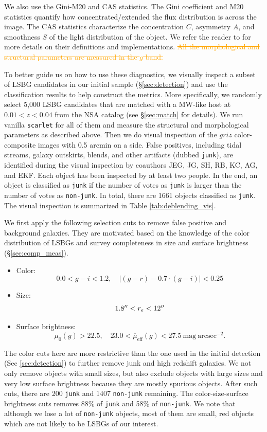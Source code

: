 \documentclass[twocolumn,astrosymb,twocolappendix,linenumbers]{aastex631}
\newcommand{\sbunit}{\mathrm{mag\ arcsec}^{-2}}
\newcommand{\sbeff}{\overline{\mu}_{\mathrm{eff}}(g)}
\newcommand{\emphasize}{\textcolor{orange}}
\newcommand{\code}[1]{\texttt{#1}}
\begin{document}
\begin{CJK*}{UTF8}{gbsn}
We also use the Gini-M20 and CAS statistics. The Gini coefficient and M20 statistics \citep{Abraham2003,Lotz2004} quantify how concentrated/extended the flux distribution is across the image. The CAS statistics characterize the concentration $C$, asymmetry $A$, and smoothness $S$ of the light distribution of the object. We refer the reader to \citet{statmorph} for more details on their definitions and implementations. \emphasize{\st{All the morphological and structural parameters are measured in the $g$ band.}}


To better guide us on how to use these diagnostics, we visually inspect a subset of LSBG candidates in our initial sample (\S \ref{sec:detection}) and use the classification results to help construct the metrics. More specifically, we randomly select 5,000 LSBG candidates that are matched with a MW-like host at $0.01 < z < 0.04$ from the NSA catalog (see \S\ref{sec:match} for details). We run vanilla \code{scarlet} for all of them and measure the structural and morphological parameters as described above. Then we do visual inspection of the $griz$ color-composite images with 0.5 arcmin on a side. False positives, including tidal streams, galaxy outskirts, blends, and other artifacts (dubbed \code{junk}), are identified during the visual inspection by coauthors JEG, JG, SH, RB, KC, AG, and EKF. Each object has been inspected by at least two people. In the end, an object is classified as \code{junk} if the number of votes as \code{junk} is larger than the number of votes as \code{non-junk}. In total, there are 1661 objects classified as \code{junk}. The visual inspection is summarized in Table \ref{tab:deblending_vis}.


We first apply the following selection cuts to remove false positive and background galaxies. They are motivated based on the knowledge of the color distribution of LSBGs \citep[e.g.,][]{SAGA-I,Greco2018,Zaritsky2019,Tanoglidis2021} and survey completeness in size and surface brightness (\S\ref{sec:comp_meas}). 
\begin{itemize}
    \item Color:
    \[0.0 < g-i < 1.2,\quad |(g-r) - 0.7\cdot (g-i)| < 0.25\]
    \item Size: \[1.8 \mbox{$^{\prime\prime}$} < r_e < 12 \mbox{$^{\prime\prime}$}\]
    \item Surface brightness: \[\mu_0(g) > 22.5,\quad 23.0 < \sbeff < 27.5\ \sbunit.\]
\end{itemize}
The color cuts here are more restrictive than the one used in the initial detection (Sec \ref{sec:detection}) to further remove junk and high redshift galaxies. We not only remove objects with small sizes, but also exclude objects with large sizes and very low surface brightness because they are mostly spurious objects.
After such cuts, there are 200 \code{junk} and 1407 \code{non-junk} remaining. The color-size-surface brightness cuts removes 88\% of \code{junk} and 58\% of \code{non-junk}. We note that although we lose a lot of \code{non-junk} objects, most of them are small, red  objects which are not likely to be LSBGs of our interest. 



\end{CJK*}
\end{document}
